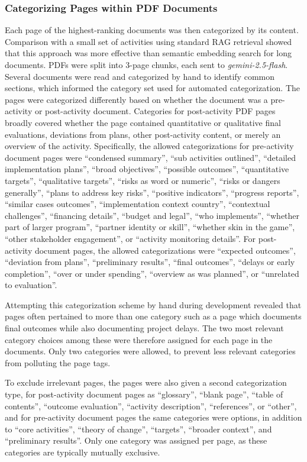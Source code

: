 \documentclass[12pt,a4paper]{article}
\begin{document}
\subsubsection{Categorizing Pages within PDF Documents}
Each page of the highest-ranking documents was then categorized by its content. Comparison with a small set of activities using standard RAG retrieval showed that this approach was more effective than semantic embedding search for long documents. PDFs were split into 3-page chunks, each sent to \emph{gemini-2.5-flash}. Several documents were read and categorized by hand to identify common sections, which informed the category set used for automated categorization. The pages were categorized differently based on whether the document was a pre-activity or post-activity document. Categories for post-activity PDF pages broadly covered whether the page contained quantitative or qualitative final evaluations, deviations from plans, other post-activity content, or merely an overview of the activity. Specifically, the allowed categorizations for pre-activity document pages were ``condensed summary'', ``sub activities outlined'', ``detailed implementation plans'', ``broad objectives'', ``possible outcomes'', ``quantitative targets'', ``qualitative targets'', ``risks as word or numeric'', ``risks or dangers generally'', ``plans to address key risks'', ``positive indicators'', ``progress reports'', ``similar cases outcomes'', ``implementation context country'', ``contextual challenges'', ``financing details'', ``budget and legal'', ``who implements'', ``whether part of larger program'', ``partner identity or skill'', ``whether skin in the game'', ``other stakeholder engagement'', or ``activity monitoring details''. For post-activity document pages, the allowed categorizations were ``expected outcomes'', ``deviation from plans'', ``preliminary results'', ``final outcomes'', ``delays or early completion'', ``over or under spending'', ``overview as was planned'', or ``unrelated to evaluation''.

Attempting this categorization scheme by hand during development revealed that pages often pertained to more than one category such as a page which documents final outcomes while also documenting project delays. The two most relevant category choices among these were therefore assigned for each page in the documents. Only two categories were allowed, to prevent less relevant categories from polluting the page tags.

To exclude irrelevant pages, the pages were also given a second categorization type, for post-activity document pages as ``glossary'', ``blank page'', ``table of contents'', ``outcome evaluation'', ``activity description'', ``references'', or ``other'', and for pre-activity document pages the same categories were options, in addition to ``core activities'', ``theory of change'', ``targets'', ``broader context'', and ``preliminary results''. Only one category was assigned per page, as these categories are typically mutually exclusive.
\end{document}
